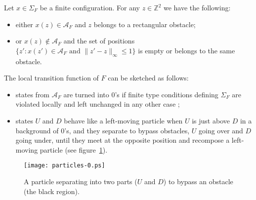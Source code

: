 \documentclass{llncs}
\newcommand{\zz}{{\mathbb{Z}^2}}
\newcommand{\A}{\mathcal{A}}
\newcommand{\acf}{F}
\newcommand{\obst}{\Sigma_{\acf}}
\newcommand{\obstset}{\A_F}
\begin{document}
\begin{lemma}
  Let ${x\in\obst}$ be a finite configuration. For any $z\in\zz$ we
  have the following:
  \begin{itemize}
  \item either ${x(z)\in\obstset}$ and $z$ belongs to a rectangular obstacle;
  \item or ${x(z)\not\in\obstset}$ and the set of positions
    ${\bigl\{z' : x(z')\in\obstset\text{ and }\|z'-z\|_\infty\leq 1\bigr\}}$
    is empty or belongs to the same obstacle.
  \end{itemize}
\end{lemma}

The local transition function of $\acf$ can be sketched as follows:
\begin{itemize}
\item states from $\obstset$ are turned into $0$'s if finite type
  conditions defining $\obst$ are violated locally and left unchanged
  in any other case ;
\item states $U$ and $D$ behave like a left-moving particle when $U$
  is just above $D$ in a background of $0$'s, and they separate to
  bypass obstacles, $U$ going over and $D$ going under, until they
  meet at the opposite position and recompose a left-moving particle
  (see figure~\ref{fig:partdyn}).
\end{itemize}

\begin{figure}
  \centering
  \texttt{[image: particles-0.ps]}
  \caption{A particle separating into two parts ($U$ and $D$) to
    bypass an obstacle (the black region).}
  \label{fig:partdyn}
\end{figure}
\end{document}
